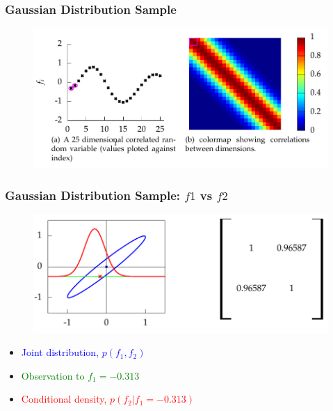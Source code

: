 \documentclass[10pt]{beamer}
\begin{document}
  \begin{frame}
    \frametitle{Gaussian Distribution Sample}

    \begin{figure}
      \centering
      \includegraphics[width=\textwidth]{samplePath.png}
    \end{figure}
  \end{frame}

  \begin{frame}[noframenumbering]
    \frametitle{Gaussian Distribution Sample: $f1$ vs $f2$}

    \begin{figure}
      \centering
      \includegraphics[width=\textwidth]{covariance1.png}
    \end{figure}

    \begin{itemize}
      \item \textcolor{blue}{Joint distribution, $p(f_1,f_2)$}
      \item \textcolor{green}{Observation to $f_1 = -0.313$}
      \item \textcolor{red}{Conditional density, $p(f_2|f_1 = -0.313)$}
    \end{itemize}
  \end{frame}
\end{document}
